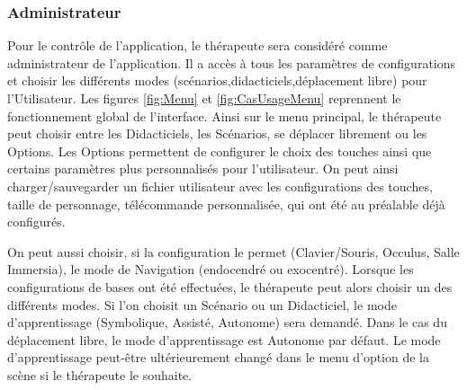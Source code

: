 \subsubsection{Administrateur}
Pour le contrôle de l'application, le thérapeute sera considéré comme administrateur de l'application. Il a accès à 
tous les paramètres de configurations et choisir les différents modes (scénarios,didacticiels,déplacement libre) pour l'Utilisateur.
\newline
Les figures \ref{fig:Menu} et \ref{fig:CasUsageMenu} reprennent le fonctionnement global de l'interface. Ainsi sur le menu principal, le thérapeute peut choisir entre les Didacticiels, les Scénarios, se déplacer librement ou les Options.
\newline
Les Options permettent de configurer le choix des touches ainsi que certains paramètres plus personnalisés pour l'utilisateur. On peut ainsi charger/sauvegarder un fichier utilisateur avec les configurations des touches, taille de personnage, télécommande personnalisée, qui ont été au préalable déjà configurés. 

On peut aussi choisir, si la configuration le permet (Clavier/Souris, Occulus, Salle Immersia), le mode de Navigation (endocendré ou exocentré). 
\newline
Lorsque les configurations de bases ont été effectuées, le thérapeute peut alors choisir un des différents modes. Si l'on choisit un Scénario ou un Didacticiel, le mode d'apprentissage (Symbolique, Assisté, Autonome) sera demandé. Dans le cas du déplacement libre, le mode d'apprentissage est Autonome par défaut. Le mode d'apprentissage peut-être ultérieurement changé dans le menu d'option de la scène si le thérapeute le souhaite. 
\newline

